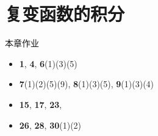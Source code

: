 \part{复变函数的积分}


\begin{frame}[<*>]{本章作业}
\begin{itemize}
\item \textbf{1}, \textbf{4}, \textbf{6}(1)(3)(5)
\item \textbf{7}(1)(2)(5)(9), \textbf{8}(1)(3)(5), \textbf{9}(1)(3)(4)
\item \textbf{15}, \textbf{17}, \textbf{23},
\item \textbf{26}, \textbf{28}, \textbf{30}(1)(2)
\end{itemize}
\end{frame}
